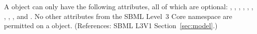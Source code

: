 A \Model object can only have the following attributes, all of which are
optional: , , , ,
, , ,
, ,  and
.  No other attributes from the SBML Level~3 Core
namespace are permitted on a \Model object.  (References: SBML L3V1
Section~\ref{sec:model}.)
